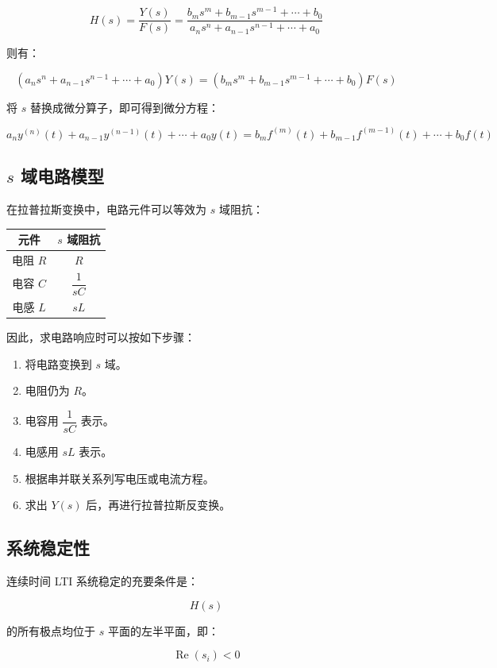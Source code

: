 \documentclass[UTF8]{ctexart}
\begin{document}
\[
H(s)=\frac{Y(s)}{F(s)}
=\frac{b_ms^m+b_{m-1}s^{m-1}+\cdots+b_0}
{a_ns^n+a_{n-1}s^{n-1}+\cdots+a_0}
\]

则有：

\[
\left(a_ns^n+a_{n-1}s^{n-1}+\cdots+a_0\right)Y(s)
=
\left(b_ms^m+b_{m-1}s^{m-1}+\cdots+b_0\right)F(s)
\]

将 $s$ 替换成微分算子，即可得到微分方程：

\[
a_ny^{(n)}(t)+a_{n-1}y^{(n-1)}(t)+\cdots+a_0y(t)
=
b_mf^{(m)}(t)+b_{m-1}f^{(m-1)}(t)+\cdots+b_0f(t)
\]

\subsection{$s$ 域电路模型}

在拉普拉斯变换中，电路元件可以等效为 $s$ 域阻抗：

\begin{table}[h]
\centering
\begin{tabular}{c c}
\toprule
元件 & $s$ 域阻抗 \\
\midrule
电阻 $R$ & $R$ \\
电容 $C$ & $\dfrac{1}{sC}$ \\
电感 $L$ & $sL$ \\
\bottomrule
\end{tabular}
\end{table}

因此，求电路响应时可以按如下步骤：

\begin{enumerate}
    \item 将电路变换到 $s$ 域。
    \item 电阻仍为 $R$。
    \item 电容用 $\dfrac{1}{sC}$ 表示。
    \item 电感用 $sL$ 表示。
    \item 根据串并联关系列写电压或电流方程。
    \item 求出 $Y(s)$ 后，再进行拉普拉斯反变换。
\end{enumerate}

\subsection{系统稳定性}

连续时间 LTI 系统稳定的充要条件是：

\[
H(s)
\]

的所有极点均位于 $s$ 平面的左半平面，即：

\[
\operatorname{Re}(s_i)<0
\]
\end{document}
